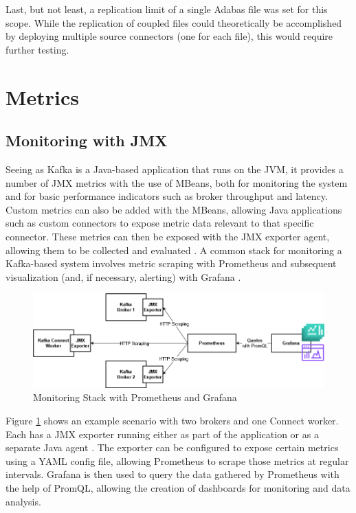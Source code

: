 Last, but not least, a replication limit of a single Adabas file was set for this scope. While the replication of coupled files could theoretically be accomplished by deploying multiple source connectors (one for each file), this would require further testing.

\section{Metrics}
\label{ch04:pipelinedevelopment:metrics}

\subsection{Monitoring with JMX}
Seeing as Kafka is a Java-based application that runs on the \ac{JVM}, it provides a number of \ac{JMX} metrics with the use of \ac{MBeans}, both for monitoring the system and for basic performance indicators such as broker throughput and latency. Custom metrics can also be added with the \ac{MBeans}, allowing Java applications such as custom connectors to expose metric data relevant to that specific connector. These metrics can then be exposed with the \ac{JMX} exporter agent, allowing them to be collected and evaluated \cite{kafkamonitoringgrafana}. A common stack for monitoring a Kafka-based system involves metric scraping with Prometheus and subsequent visualization (and, if necessary, alerting) with Grafana \cite{applicationmonitoringkafka}.

\begin{figure}[htbp]
 \centering
 \includegraphics[width=1\textwidth]{chapters/images/kafka prometheus monitoring stack enlarged.drawio.png}
 \caption{Monitoring Stack with Prometheus and Grafana}
 \label{fig:chapter04:metrics:prometheusstack}
\end{figure}

Figure \ref{fig:chapter04:metrics:prometheusstack} shows an example scenario with two brokers and one Connect worker. Each has a \ac{JMX} exporter running either as part of the application or as a separate Java agent \cite{kafkamonitoringgrafana}. The exporter can be configured to expose certain metrics using a YAML config file, allowing Prometheus to scrape those metrics at regular intervals. Grafana is then used to query the data gathered by Prometheus with the help of \ac{PromQL}, allowing the creation of dashboards for monitoring and data analysis.

